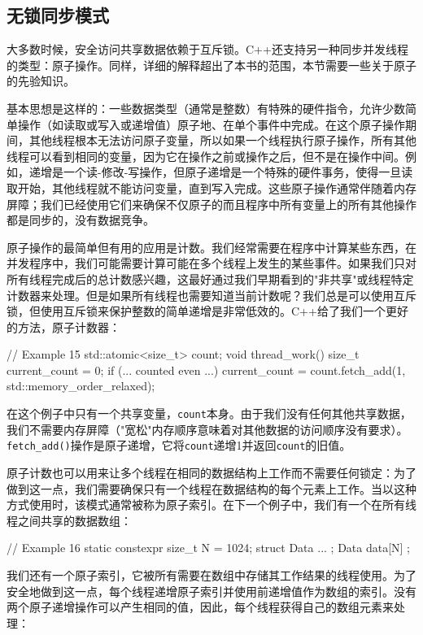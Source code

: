 \subsection{无锁同步模式}

大多数时候，安全访问共享数据依赖于互斥锁。C++还支持另一种同步并发线程的类型：原子操作。同样，详细的解释超出了本书的范围，本节需要一些关于原子的先验知识。

基本思想是这样的：一些数据类型（通常是整数）有特殊的硬件指令，允许少数简单操作（如读取或写入或递增值）原子地、在单个事件中完成。在这个原子操作期间，其他线程根本无法访问原子变量，所以如果一个线程执行原子操作，所有其他线程可以看到相同的变量，因为它在操作之前或操作之后，但不是在操作中间。例如，递增是一个读-修改-写操作，但原子递增是一个特殊的硬件事务，使得一旦读取开始，其他线程就不能访问变量，直到写入完成。这些原子操作通常伴随着内存屏障；我们已经使用它们来确保不仅原子的而且程序中所有变量上的所有其他操作都是同步的，没有数据竞争。

原子操作的最简单但有用的应用是计数。我们经常需要在程序中计算某些东西，在并发程序中，我们可能需要计算可能在多个线程上发生的某些事件。如果我们只对所有线程完成后的总计数感兴趣，这最好通过我们早期看到的"非共享"或线程特定计数器来处理。但是如果所有线程也需要知道当前计数呢？我们总是可以使用互斥锁，但使用互斥锁来保护整数的简单递增是非常低效的。C++给了我们一个更好的方法，原子计数器：

\begin{code}
// Example 15
std::atomic<size_t> count;
void thread_work() {
  size_t current_count = 0;
  if (... counted even ...) {
    current_count =
      count.fetch_add(1, std::memory_order_relaxed);
  }
}
\end{code}

在这个例子中只有一个共享变量，\texttt{count}本身。由于我们没有任何其他共享数据，我们不需要内存屏障（"宽松"内存顺序意味着对其他数据的访问顺序没有要求）。\texttt{fetch\_add()}操作是原子递增，它将\texttt{count}递增1并返回\texttt{count}的旧值。

原子计数也可以用来让多个线程在相同的数据结构上工作而不需要任何锁定：为了做到这一点，我们需要确保只有一个线程在数据结构的每个元素上工作。当以这种方式使用时，该模式通常被称为原子索引。在下一个例子中，我们有一个在所有线程之间共享的数据数组：

\begin{code}
// Example 16
static constexpr size_t N = 1024;
struct Data { ... };
Data data[N] {};
\end{code}

我们还有一个原子索引，它被所有需要在数组中存储其工作结果的线程使用。为了安全地做到这一点，每个线程递增原子索引并使用前递增值作为数组的索引。没有两个原子递增操作可以产生相同的值，因此，每个线程获得自己的数组元素来处理：

